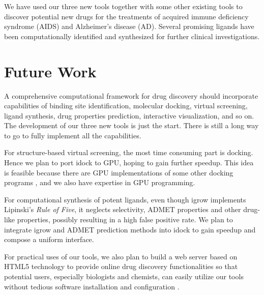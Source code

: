We have used our three new tools together with some other existing tools to discover potential new drugs for the treatments of acquired immune deficiency syndrome (AIDS) and Alzheimer's disease (AD). Several promising ligands have been computationally identified and synthesized for further clinical investigations.

\section{Future Work}

A comprehensive computational framework for drug discovery should incorporate capabilities of binding site identification, molecular docking, virtual screening, ligand synthesis, drug properties prediction, interactive visualization, and so on. The development of our three new tools is just the start. There is still a long way to go to fully implement all the capabilities.

For structure-based virtual screening, the most time consuming part is docking. Hence we plan to port idock to GPU, hoping to gain further speedup. This idea is feasible because there are GPU implementations of some other docking programs \citep{723,652,779}, and we also have expertise in GPU programming.

For computational synthesis of potent ligands, even though igrow implements Lipinski's \textit{Rule of Five}, it neglects selectivity, ADMET properties and other drug-like properties, possibly resulting in a high false positive rate. We plan to integrate igrow and ADMET prediction methods into idock to gain speedup and compose a uniform interface.

For practical uses of our tools, we also plan to build a web server based on HTML5 technology to provide online drug discovery functionalities so that potential users, especially biologists and chemists, can easily utilize our tools without tedious software installation and configuration \citep{677}.

\chapterend
